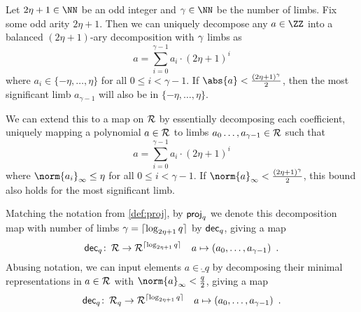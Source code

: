 \begin{definition}
    Let $2\eta+1\in\NN$ be an odd integer and $\limbs\in\NN$ be the number of limbs. Fix some odd arity $2\eta+1$.
    Then we can uniquely decompose any $a\in\ZZ$ into a balanced $(2\eta+1)$-ary decomposition with $\gamma$ limbs as
    \[
     a = \sum_{i=0}^{\gamma-1} a_i \cdot (2\eta+1)^i
    \]
    where $a_i \in \{-\eta,\ldots, \eta\}$ for all $0\leq i <\gamma-1$.
    If $\abs{a} < \tfrac{(2\eta+1)^\gamma}{2}$, then the most significant limb $a_{\gamma-1}$ will also be in $\{-\eta,\ldots,\eta\}$.
    
    We can extend this to a map on $\mathcal{R}$ by essentially decomposing each coefficient, uniquely mapping a polynomial $a\in\mathcal{R}$ to limbs $a_0\ldots,a_{\gamma-1}\in \mathcal{R}$ such that
    \[
     a = \sum_{i=0}^{\gamma-1} a_i \cdot (2\eta+1)^i
    \]
    where $\norm{a_i}_{\infty} \leq \eta$ for all $0\leq i < \gamma-1$. If $\norm{a}_{\infty} < \tfrac{(2\eta+1)^\gamma}{2}$, this bound also holds for the most significant limb.
    
    Matching the notation from \autoref{def:proj}, by $\mathsf{proj}_q$ we denote this decomposition map with number of limbs $\gamma = \lceil \log_{2\eta+1} q \rceil$ by $\mathsf{dec}_q$, giving a map
    \[
     \mathsf{dec}_q \colon\, \mathcal{R} \to \mathcal{R}^{\lceil\log_{2\eta+1} q\rceil}\quad a \mapsto (a_0,\ldots,a_{\gamma-1})\enspace.
    \]
    Abusing notation, we can input elements $a\in\ring_q$ by decomposing their minimal representations in $a\in\mathcal{R}$ with $\norm{a}_{\infty} < \tfrac{q}{2}$, giving a map
    \[
     \mathsf{dec}_q \colon\, \mathcal{R}_q \to \mathcal{R}^{\lceil\log_{2\eta+1} q\rceil}\quad a \mapsto (a_0,\ldots,a_{\gamma-1})\enspace.
    \]
\end{definition}

